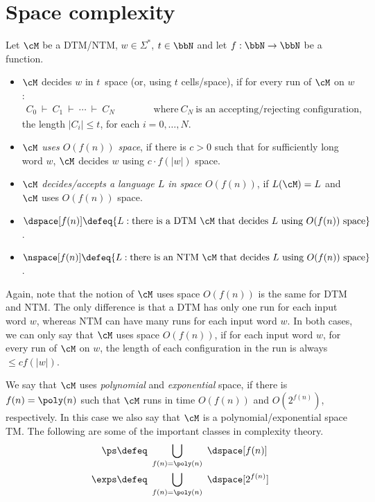 \documentclass[11pt, a4paper]{article}
\begin{document}
\section{Space complexity}

\begin{definition}
\label{def:space}
Let $\cM$ be a DTM/NTM, $w\in \Sigma^*$, $t\in \bbN$ and let $f:\bbN\to\bbN$ be a function.
\begin{itemize}
\item
$\cM$ decides $w$ in $t$~space (or, using $t$ cells/space), 
if for every run of $\cM$ on $w$:
\begin{eqnarray*}
C_0 \ \vdash \ C_1 \ \vdash \ \cdots \ \vdash \ C_N
& & \hspace{1cm}\mbox{where} \ C_N \ \mbox{is an accepting/rejecting configuration,}
\end{eqnarray*}
the length $|C_i| \leq t$, for each $i=0,\ldots, N$.
\item
{\em $\cM$ uses $O(f(n))$ space}, if 
there is $c>0$ such that for sufficiently long word $w$,
$\cM$ decides $w$ using $c\cdot f(|w|)$ space.
\item
{\em $\cM$ decides/accepts a language $L$ in space $O(f(n))$},
if $L(\cM)=L$ and $\cM$ uses $O(f(n))$ space.
\item
$\dspace[f(n)] \defeq 
\{L  :  \text{there is a DTM}\ \cM \ \text{that decides} \ L \ \text{using} \ O(f(n))\ \text{space}\}$.
\item
$\nspace[f(n)] \defeq 
\{L  :  \text{there is an NTM}\ \cM \ \text{that decides} \ L \ \text{using} \ O(f(n))\ \text{space}\}$.
\end{itemize}
\end{definition}

Again, note that the notion of $\cM$ uses space $O(f(n))$ is the same for DTM and NTM.
The only difference is that a DTM has only one run for each input word $w$,
whereas NTM can have many runs for each input word $w$.
In both cases, we can only say that $\cM$ uses space $O(f(n))$,
if for each input word $w$, for every run of $\cM$ on $w$,
the length of each configuration in the run is always $\leq c f(|w|)$.


We say that $\cM$ uses {\em polynomial} and {\em exponential} space,
if there is $f(n)=\poly(n)$ such that $\cM$ runs in time $O(f(n))$ and $O(2^{f(n)})$, respectively.
In this case we also say that $\cM$ is a polynomial/exponential space TM.
The following are some of the important classes in complexity theory.
\begin{align*}
\ps & \defeq \ \bigcup_{f(n)=\poly(n)} \ \dspace[f(n)]
\\
\exps & \defeq \ \bigcup_{f(n)=\poly(n)} \ \dspace[2^{f(n)}]
\end{align*}
\end{document}
